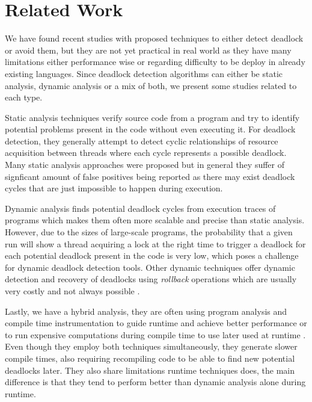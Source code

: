 \section{Related Work}

We have found recent studies with proposed techniques to either detect deadlock or avoid them, but they are not yet practical in real world as they have many limitations either performance wise or regarding difficulty to be deploy in already existing languages. Since deadlock detection algorithms can either be static analysis, dynamic analysis or a mix of both, we present some studies related to each type.

Static analysis techniques verify source code from a program and try to identify potential problems present in the code without even executing it.
For deadlock detection, they generally attempt to detect cyclic relationships of resource acquisition between threads where each cycle represents a possible deadlock.
Many static analysis approaches were proposed \cite{marino}\cite{dawson}\cite{vivek}\cite{williams}
but in general they suffer of signficant amount of false positives being reported as there may exist deadlock cycles that are just impossible to happen during execution.

Dynamic analysis \cite{mcsdk}\cite{magicfuzzer} finds potential deadlock cycles from execution traces of programs which makes them often more scalable and precise than static analysis.
However, due to the sizes of large-scale programs, the probability that a given run will show a thread acquiring a lock at the right time to trigger a deadlock for
each potential deadlock present in the code is very low, which poses a challenge for dynamic deadlock detection tools. Other dynamic techniques \cite{sammati} \cite{rx} offer dynamic detection and recovery of deadlocks using \emph{rollback} operations which are usually very costly and not always possible \cite{pyla}. 

Lastly, we have a hybrid analysis, they are often using program analysis and compile time instrumentation to guide runtime and achieve better performance \cite{serenity}
or to run expensive computations during compile time to use later used at runtime \cite{grechanik}. Even though they employ both techniques simultaneously, they generate slower compile times, also requiring recompiling code to be able to find new potential deadlocks later. They also share limitations runtime techniques does, the main difference is that they tend to perform better than dynamic analysis alone during runtime.
